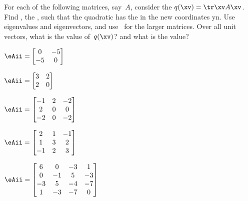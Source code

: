 \begin{exercise}  
For each of the following matrices, say~\(A\), consider the  \(q(\xv)=\tr\xv A\xv\).
Find , the , such that the quadratic has the  in the new coordinates \hlist yn.
Use eigenvalues and eigenvectors, and use \script\ for the larger matrices.
Over all unit vectors, what is the  value of~\(q(\xv)\)? and what is the  value?

\begin{Parts}
\item \(\eAii=\begin{bmatrix} 0&-5
\\-5&0 \end{bmatrix}\)

\begin{reduce}
\item \(\eAii=\begin{bmatrix} 3&2
\\2&0 \end{bmatrix}\)

\item \(\eAii=\begin{bmatrix} -1&2&-2
\\2&0&0
\\-2&0&-2 \end{bmatrix}\)
\end{reduce}

\item \(\eAii=\begin{bmatrix} 2&1&-1
\\1&3&2
\\-1&2&3 \end{bmatrix}\)

\item {\small%
\(\eAii=\begin{bmatrix} 6&0&-3&1
\\0&-1&5&-3
\\-3&5&-4&-7
\\1&-3&-7&0 \end{bmatrix}\)
}%


\end{Parts}
\end{exercise}
